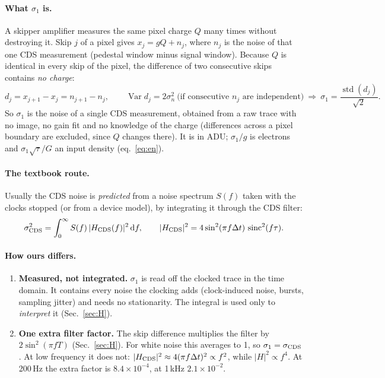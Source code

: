 \documentclass[10pt,a4paper]{article}
\newcommand{\dd}{\,\mathrm{d}}
\newcommand{\sinc}{\operatorname{sinc}}
\newcommand{\std}{\operatorname{std}}
\begin{document}
\paragraph{What $\sigma_1$ is.} A skipper amplifier measures the same pixel charge $Q$ many times without destroying it.
Skip $j$ of a pixel gives $x_j=gQ+n_j$, where $n_j$ is the noise of that one CDS measurement (pedestal window minus
signal window). Because $Q$ is identical in every skip of the pixel, the difference of two consecutive skips contains
\emph{no charge}:
\begin{equation}
d_j=x_{j+1}-x_j=n_{j+1}-n_j,\qquad
\operatorname{Var}d_j=2\sigma_n^2\ \text{(if consecutive } n_j \text{ are independent)}
\ \Rightarrow\ \sigma_1=\frac{\std(d_j)}{\sqrt2}.
\end{equation}
So $\sigma_1$ is the noise of a single CDS measurement, obtained from a raw trace with no image, no gain fit and no
knowledge of the charge (differences across a pixel boundary are excluded, since $Q$ changes there). It is in ADU;
$\sigma_1/g$ is electrons and $\sigma_1\sqrt\tau/G$ an input density (eq.~\eqref{eq:en}).

\paragraph{The textbook route.} Usually the CDS noise is \emph{predicted} \cite{hopkinson1982,janesick2001} from a noise spectrum $S(f)$ taken with the
clocks stopped (or from a device model), by integrating it through the CDS filter:
\begin{equation}
\sigma_{\rm CDS}^2=\int_0^\infty S(f)\,|H_{\rm CDS}(f)|^2\dd f,\qquad |H_{\rm CDS}|^2=4\sin^2(\pi f\Delta t)\,\sinc^2(f\tau).
\end{equation}

\paragraph{How ours differs.}
\begin{enumerate}
\item \textbf{Measured, not integrated.} $\sigma_1$ is read off the clocked trace in the time domain. It contains every
noise the clocking adds (clock-induced noise, bursts, sampling jitter) and needs no stationarity. The integral is used
only to \emph{interpret} it (Sec.~\ref{sec:H}).
\item \textbf{One extra filter factor.} The skip difference multiplies the filter by $2\sin^2(\pi fT)$ (Sec.~\ref{sec:H}).
For white noise this averages to 1, so $\sigma_1=\sigma_{\rm CDS}$. At low frequency it does not:
$|H_{\rm CDS}|^2\approx4(\pi f\Delta t)^2\propto f^2$, while $|H|^2\propto f^4$. At 200\,Hz the extra factor is
$8.4\times10^{-4}$, at 1\,kHz $2.1\times10^{-2}$.
\end{enumerate}
\end{document}
